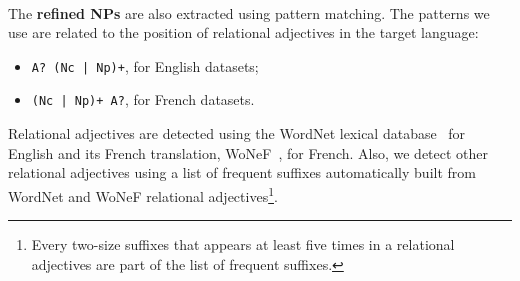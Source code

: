       \paragraph{}
      The \textbf{refined NPs} are also extracted using pattern matching. The
      patterns we use are related to the position of relational adjectives in
      the target language:
      \begin{itemize}
        \item{\verb:A? (Nc | Np)+:, for English datasets;}
        \item{\verb:(Nc | Np)+ A?:, for French datasets.}
      \end{itemize}
      Relational adjectives are detected using the WordNet lexical
      database~\cite{miller1995wordnet} for English and its French translation,
      WoNeF~\cite{pradet2013wonef}, for French. Also, we detect other relational
      adjectives using a list of frequent suffixes automatically built from
      WordNet and WoNeF relational adjectives\footnote{Every two-size suffixes
      that appears at least five times in a relational adjectives are part of
      the list of frequent suffixes. }.

